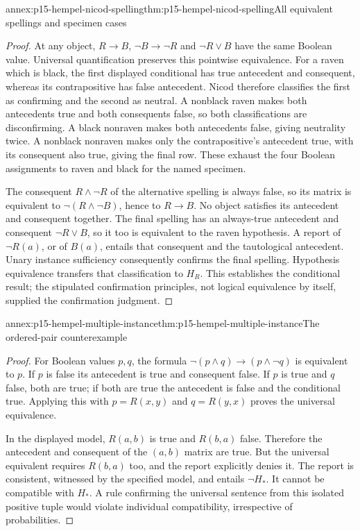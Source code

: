 \begin{annexitem}{annex:p15-hempel-nicod-spelling}{thm:p15-hempel-nicod-spelling}{All equivalent spellings and specimen cases}
\begin{proof}
At any object, $R\to B$, $\neg B\to\neg R$ and $\neg R\lor B$
have the same Boolean value. Universal quantification preserves this
pointwise equivalence. For a raven which is black, the first displayed
conditional has true antecedent and consequent, whereas its contrapositive
has false antecedent. Nicod therefore classifies the first as confirming
and the second as neutral. A nonblack raven makes both antecedents true
and both consequents false, so both classifications are disconfirming.
A black nonraven makes both antecedents false, giving neutrality twice.
A nonblack nonraven makes only the contrapositive's antecedent true, with
its consequent also true, giving the final row. These exhaust the four
Boolean assignments to raven and black for the named specimen.

The consequent $R\land\neg R$ of the alternative spelling is always
false, so its matrix is equivalent to $\neg(R\land\neg B)$, hence to
$R\to B$. No object satisfies its antecedent and consequent together.
The final spelling has an always-true antecedent and consequent
$\neg R\lor B$, so it too is equivalent to the raven hypothesis.
A report of $\neg R(a)$, or of $B(a)$, entails that consequent and the
tautological antecedent. Unary instance sufficiency consequently confirms
the final spelling. Hypothesis equivalence transfers that classification
to $H_R$. This establishes the conditional result; the stipulated
confirmation principles, not logical equivalence by itself, supplied
the confirmation judgment.
\end{proof}
\end{annexitem}

\begin{annexitem}{annex:p15-hempel-multiple-instance}{thm:p15-hempel-multiple-instance}{The ordered-pair counterexample}
\begin{proof}
For Boolean values $p,q$, the formula
$\neg(p\land q)\to(p\land\neg q)$ is equivalent to $p$.
If $p$ is false its antecedent is true and consequent false. If $p$ is
true and $q$ false, both are true; if both are true the antecedent is
false and the conditional true. Applying this with $p=R(x,y)$ and
$q=R(y,x)$ proves the universal equivalence.

In the displayed model, $R(a,b)$ is true and $R(b,a)$ false. Therefore
the antecedent and consequent of the $(a,b)$ matrix are true. But the
universal equivalent requires $R(b,a)$ too, and the report explicitly
denies it. The report is consistent, witnessed by the specified model,
and entails $\neg H_*$. It cannot be compatible with $H_*$. A rule
confirming the universal sentence from this isolated positive tuple
would violate individual compatibility, irrespective of probabilities.
\end{proof}
\end{annexitem}

